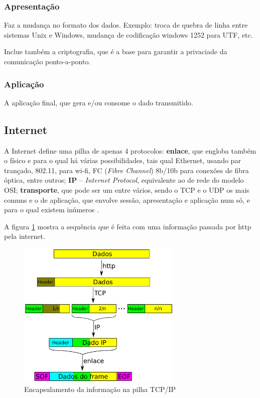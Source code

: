 \subsubsection{Apresentação}
Faz a mudança no formato dos dados. Exemplo: troca de quebra de linha entre sistemas Unix e Windows, mudança de codificação windows 1252 para UTF, etc.

Inclue também a criptografia, que é a base para garantir a privaciade da comunicação ponto-a-ponto.

\subsubsection{Aplicação}
A aplicação final, que gera e/ou consome o dado transmitido.

\subsection{Internet}
	A Internet define uma pilha de apenas 4 protocolos: \textbf{enlace}, que engloba também o físico e para o qual há várias possibilidades, tais qual Ethernet, usando par trançado, 802.11, para wi-fi, FC (\emph{Fibre Channel}) 8b/10b para conexões de fibra óptica, entre outros; \textbf{IP} -- \emph{Internet Protocol}, equivalente ao de rede do modelo OSI; \textbf{transporte}, que pode ser um entre vários, sendo o TCP e o UDP os mais comuns e o de aplicação, que envolve sessão, apresentação e aplicação num só, e para o qual existem inúmeros
	.

	A figura \ref{fig:tcp-ip} mostra a sequência que é feita com uma informação passada por http pela internet.
	\begin{figure}[hbt]
		\begin{center}
			\includegraphics[width=0.7\textwidth]{figuras/tcp-ip}
%		   
			\caption{Encapsulamento da informação na pilha TCP/IP}
			\label{fig:tcp-ip}
		\end{center}
	\end{figure}

